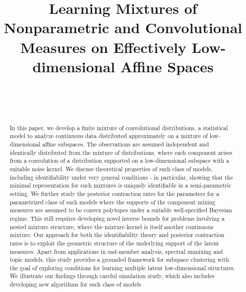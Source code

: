 \documentclass[bj,authoryear]{imsart}
\theoremstyle{plain}
\theoremstyle{remark}
\begin{document}
\begin{frontmatter}

\title{Learning Mixtures of Nonparametric and Convolutional Measures on Effectively Low-dimensional Affine Spaces}

\begin{aug}
\author[A]{\inits{}~}
\author[B]{\inits{}~}
\address[A]{Duke University}
\address[B]{University of Michigan, Ann Arbor}

\end{aug}

\begin{abstract}
In this paper, we develop a finite mixture of convolutional distributions, a statistical model to analyze continuous data distributed approximately on a mixture of low-dimensional affine subspaces. The observations are assumed independent and identically distributed from the mixture of distributions, where each component arises from a convolution of a distribution supported on a low-dimensional subspace with a suitable noise kernel. We discuss theoretical properties of such class of models, including identifiability under very general conditions - in particular, showing that the minimal representation for such mixtures is uniquely identifiable in a semi-parametric setting. We further study the posterior contraction rates for the parameters for a parametrized class of such models where the supports of the component mixing measures are assumed to be convex polytopes under a suitable well-specified Bayesian regime. This still requires developing novel inverse bounds for problems involving a nested mixture structure, where the mixture kernel is itself another continuous mixture. Our approach for both the identifiability theory and posterior contraction rates is to exploit the geometric structure of the underlying support of the latent measures. Apart from applications in end-member analysis, spectral unmixing and topic models, this study provides a grounded framework for subspace clustering with the goal of exploring conditions for learning multiple latent low-dimensional structures.  We illustrate our findings through careful simulation study, which also includes developing new algorithms for such class of models
\end{abstract}


\end{frontmatter}
\end{document}

